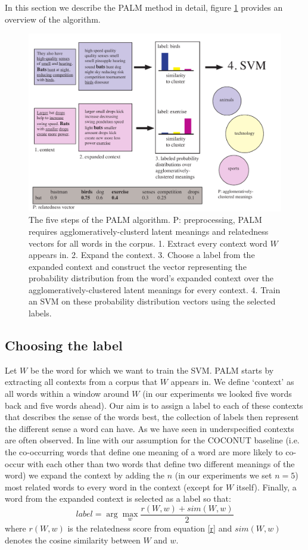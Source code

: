 \documentclass[11pt]{article}
\begin{document}
In this section we describe the PALM method in detail, figure \ref{palmimg} provides an overview of the algorithm. 
\begin{figure}
\center
\includegraphics[scale=0.5]{images/palm.pdf}
\caption{The five steps of the PALM algorithm. P: preprocessing, PALM requires agglomeratively-clusterd latent meanings and relatedness vectors for all words in the corpus. 1. Extract every context word $W$ appears in. 2. Expand the context. 3. Choose a label from the expanded context and construct the vector representing the probability distribution from the word's expanded context over the agglomeratively-clustered latent meanings for every context. 4. Train an SVM on these probability distribution vectors using the selected labels.}
\label{palmimg}
\end{figure}

\subsection{Choosing the label}
Let $W$ be the word for which we want to train the SVM. PALM starts by extracting all contexts from a corpus that $W$ appears in. We define `context' as all words within a window around $W$ (in our experiments we looked five words back and five words ahead). Our aim is to assign a label to each of these contexts that describes the sense of the words best, the collection of labels then represent the different sense a word can have. As we have seen in \cite{analysis} underspecified contexts are often observed. In line with our assumption for the COCONUT baseline (i.e. the co-occurring words that define one meaning of a word are more likely to co-occur with each other than two words that define two different meanings of the word) we expand the context by adding the $n$ (in our experiments we set $n=5$) most related words to every word in the context (except for $W$ itself). Finally, a word from the expanded context is selected as a label so that:
\begin{equation}\label{label}label = \arg\max_w \frac{r(W, w) + \textit{sim}(W, w)}{2}\end{equation}
where $r(W, w)$ is the relatedness score from equation \ref{r} and $\textit{sim}(W, w)$ denotes the cosine similarity between $W$ and $w$. 
\end{document}
